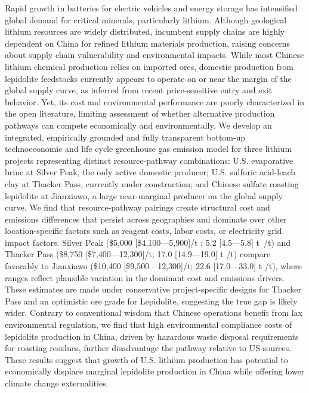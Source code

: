 Rapid growth in batteries for electric vehicles and energy storage has intensified global demand for critical minerals, particularly lithium. Although geological lithium resources are widely distributed, incumbent supply chains are highly dependent on China for refined lithium materials production, raising concerns about supply chain vulnerability and environmental impacts. While most Chinese lithium chemical production relies on imported ores, domestic production from lepidolite feedstocks currently appears to operate on or near the margin of the global supply curve, as inferred from recent price-sensitive entry and exit behavior. Yet, its cost and environmental performance are poorly characterized in the open literature, limiting assessment of whether alternative production pathways can compete economically and environmentally. We develop an integrated, empirically grounded and fully transparent bottom-up technoeconomic and life cycle greenhouse gas emission model for three lithium projects representing distinct resource-pathway combinations: U.S. evaporative brine at Silver Peak, the only active domestic producer; U.S. sulfuric acid-leach clay at Thacker Pass, currently under construction; and Chinese sulfate roasting lepidolite at Jianxiawo, a large near-marginal producer on the global supply curve. We find that resource-pathway pairings create structural cost and emissions differences that persist across geographies and dominate over other location-specific factors such as reagent costs, labor costs, or electricity grid impact factors. Silver Peak (\$5,000 [\$4,100---5,900]/t ; 5.2 [4.5---5.8] t~/t) and Thacker Pass (\$8,750 [\$7,400---12,300]/t; 17.0 [14.9---19.0] t /t) compare favorably to Jianxiawo (\$10,400 [\$9,500---12,300]/t; 22.6 [17.0---33.0] t /t), where ranges reflect plausible variation in the dominant cost and emissions drivers. These estimates are made under conservative project-specific designs for Thacker Pass and an optimistic ore grade for Lepidolite, suggesting the true gap is likely wider. Contrary to conventional wisdom that Chinese operations benefit from lax environmental regulation, we find that high environmental compliance costs of lepidolite production in China, driven by hazardous waste disposal requirements for roasting residues, further disadvantage the pathway relative to US sources. These results suggest that growth of U.S. lithium production has potential to economically displace marginal lepidolite production in China while offering lower climate change externalities.

